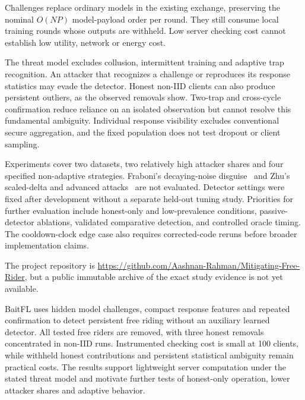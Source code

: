 \documentclass[conference]{IEEEtran}
\makeatletter
\renewcommand{\section}{\@startsection{section}{1}{\z@}{1.5ex}{0.7ex}{\normalfont\normalsize\centering\scshape}}
\makeatother
\begin{document}
Challenges replace ordinary models in the existing exchange, preserving
the nominal $O(NP)$ model-payload order per round. They still consume
local training rounds whose outputs are withheld. Low server checking
cost cannot establish low utility, network or energy cost.

The threat model excludes collusion, intermittent training and adaptive
trap recognition. An attacker that recognizes a challenge or reproduces
its response statistics may evade the detector. Honest non-IID clients
can also produce persistent outliers, as the observed removals show.
Two-trap and cross-cycle confirmation reduce reliance on an isolated
observation but cannot resolve this fundamental ambiguity. Individual
response visibility excludes conventional secure aggregation, and the
fixed population does not test dropout or client sampling.

Experiments cover two datasets, two relatively high attacker shares and
four specified non-adaptive strategies. Fraboni's decaying-noise
disguise~\cite{fraboni2021freerider} and Zhu's scaled-delta and advanced
attacks~\cite{zhu2021advanced} are not evaluated. Detector settings were
fixed after development without a separate held-out tuning study.
Priorities for further evaluation include honest-only and low-prevalence
conditions, passive-detector ablations, validated comparative detection,
and controlled oracle timing. The cooldown-clock edge case also requires
corrected-code reruns before broader implementation claims.

The project repository is
\url{https://github.com/Aashnan-Rahman/Mitigating-Free-Rider},
but a public immutable archive of the exact study evidence is not yet
available.

\section{Conclusion}
BaitFL uses hidden model challenges, compact response features and
repeated confirmation to detect persistent free riding without an
auxiliary learned detector. All tested free riders are removed, with
three honest removals concentrated in non-IID runs. Instrumented checking
cost is small at 100 clients, while withheld honest contributions and
persistent statistical ambiguity remain practical costs. The results
support lightweight server computation under the stated threat model
and motivate further tests of honest-only operation, lower attacker
shares and adaptive behavior.



\end{document}
